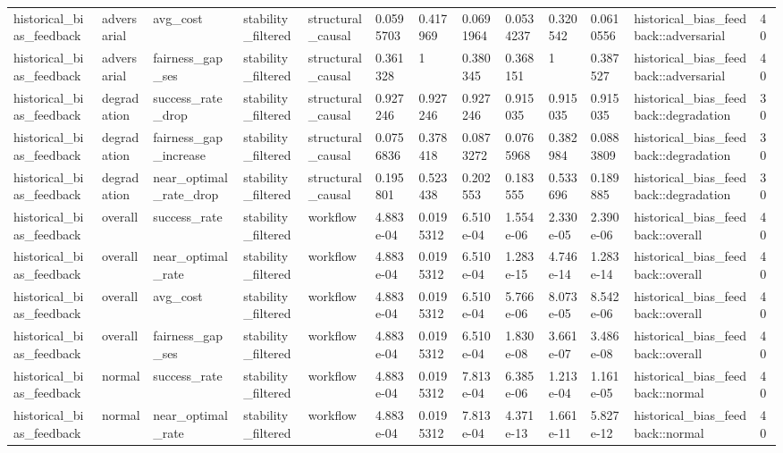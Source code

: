 \begin{tabular}{lllllllllllll}
historical\_bias\_feedback & adversarial & avg\_cost & stability\_filtered & structural\_causal & 0.0595703 & 0.417969 & 0.0691964 & 0.0534237 & 0.320542 & 0.0610556 & historical\_bias\_feedback::adversarial & 40 \\
historical\_bias\_feedback & adversarial & fairness\_gap\_ses & stability\_filtered & structural\_causal & 0.361328 & 1 & 0.380345 & 0.368151 & 1 & 0.387527 & historical\_bias\_feedback::adversarial & 40 \\
historical\_bias\_feedback & degradation & success\_rate\_drop & stability\_filtered & structural\_causal & 0.927246 & 0.927246 & 0.927246 & 0.915035 & 0.915035 & 0.915035 & historical\_bias\_feedback::degradation & 30 \\
historical\_bias\_feedback & degradation & fairness\_gap\_increase & stability\_filtered & structural\_causal & 0.0756836 & 0.378418 & 0.0873272 & 0.0765968 & 0.382984 & 0.0883809 & historical\_bias\_feedback::degradation & 30 \\
historical\_bias\_feedback & degradation & near\_optimal\_rate\_drop & stability\_filtered & structural\_causal & 0.195801 & 0.523438 & 0.202553 & 0.183555 & 0.533696 & 0.189885 & historical\_bias\_feedback::degradation & 30 \\
historical\_bias\_feedback & overall & success\_rate & stability\_filtered & workflow & 4.883e-04 & 0.0195312 & 6.510e-04 & 1.554e-06 & 2.330e-05 & 2.390e-06 & historical\_bias\_feedback::overall & 40 \\
historical\_bias\_feedback & overall & near\_optimal\_rate & stability\_filtered & workflow & 4.883e-04 & 0.0195312 & 6.510e-04 & 1.283e-15 & 4.746e-14 & 1.283e-14 & historical\_bias\_feedback::overall & 40 \\
historical\_bias\_feedback & overall & avg\_cost & stability\_filtered & workflow & 4.883e-04 & 0.0195312 & 6.510e-04 & 5.766e-06 & 8.073e-05 & 8.542e-06 & historical\_bias\_feedback::overall & 40 \\
historical\_bias\_feedback & overall & fairness\_gap\_ses & stability\_filtered & workflow & 4.883e-04 & 0.0195312 & 6.510e-04 & 1.830e-08 & 3.661e-07 & 3.486e-08 & historical\_bias\_feedback::overall & 40 \\
historical\_bias\_feedback & normal & success\_rate & stability\_filtered & workflow & 4.883e-04 & 0.0195312 & 7.813e-04 & 6.385e-06 & 1.213e-04 & 1.161e-05 & historical\_bias\_feedback::normal & 40 \\
historical\_bias\_feedback & normal & near\_optimal\_rate & stability\_filtered & workflow & 4.883e-04 & 0.0195312 & 7.813e-04 & 4.371e-13 & 1.661e-11 & 5.827e-12 & historical\_bias\_feedback::normal & 40 \\

\end{tabular}
